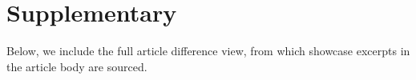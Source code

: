 \section{Supplementary}

Below, we include the full article difference view, from which showcase excerpts in the article body are sourced.

\clearpage



